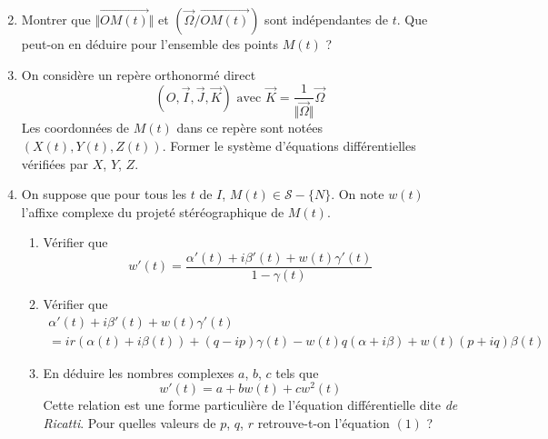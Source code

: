 \begin{enumerate} \setcounter{enumi}{1}
 \item Montrer que $\Vert \overrightarrow{OM(t)}\Vert$ et $(\overrightarrow \Omega / \overrightarrow{OM(t)})$ sont indépendantes de $t$. Que peut-on en déduire pour l'ensemble des points $M(t)$ ?

\item On considère un repère orthonormé direct
\begin{displaymath}
 (O,\overrightarrow I ,\overrightarrow J , \overrightarrow K) \text{ avec }
\overrightarrow K = 
\dfrac{1}{\Vert\overrightarrow{\Omega} \Vert}\overrightarrow{\Omega}
\end{displaymath}
Les coordonnées de $M(t)$ dans ce repère sont notées $(X(t),Y(t),Z(t))$. Former le système d'équations différentielles vérifiées par $X$, $Y$, $Z$. 
\item On suppose que pour tous les $t$ de $I$, $M(t)\in\mathcal S-\{N\}$. On note $w(t)$ l'affixe complexe du projeté stéréographique de $M(t)$.
\begin{enumerate}
 \item Vérifier que
\begin{displaymath}
 w'(t) = \dfrac{\alpha'(t)+i\beta'(t)+w(t)\gamma'(t)}{1-\gamma(t)}
\end{displaymath}
\item Vérifier que
\begin{multline*}
 \alpha'(t)+i\beta'(t)+w(t)\gamma'(t) \\= 
ir(\alpha(t)+i\beta(t))+(q-ip)\gamma(t)-w(t)q(\alpha +i\beta)+w(t)(p+iq)\beta(t)
\end{multline*}
\item En déduire les nombres complexes $a$, $b$, $c$ tels que
\begin{displaymath}
 w'(t) = a + bw(t) +cw^2(t)
\end{displaymath}
Cette relation est une forme particulière de l'équation différentielle dite \emph{de Ricatti}. Pour quelles valeurs de $p$, $q$, $r$ retrouve-t-on l'équation $(1)$ ?
\end{enumerate}

\end{enumerate}

